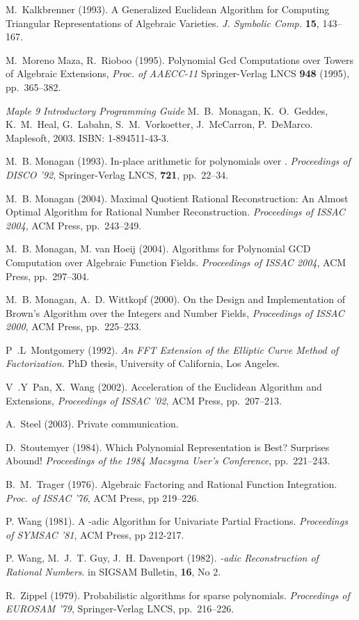 \documentclass[10pt]{article}
\begin{document}
\begin{thebibliography}{}
 M.~Kalkbrenner (1993).
A Generalized Euclidean Algorithm for Computing
Triangular Representations of Algebraic Varieties.
{\it J. Symbolic Comp.} {\bf 15}, 143--167.

 M.~Moreno Maza, R.~Rioboo (1995).
Polynomial Gcd Computations over Towers of Algebraic Extensions,
{\it Proc. of AAECC-11} Springer-Verlag LNCS {\bf 948} (1995), pp.~365--382.

{\it Maple 9 Introductory Programming Guide}
M.~B.~Monagan, K.~O.~Geddes, K.~M.~Heal, G.~Labahn,
S.~M.~Vorkoetter, J.~McCarron, P.~DeMarco.
Maplesoft, 2003.  ISBN: 1-894511-43-3.

 M.~B. Monagan (1993).
In-place arithmetic for polynomials over .
{\it Proceedings of DISCO '92}, Springer-Verlag LNCS, {\bf 721}, pp.~22--34.

 M.~B. Monagan (2004).
Maximal Quotient Rational Reconstruction: An Almost Optimal
Algorithm for Rational Number Reconstruction. 
{\it Proceedings of ISSAC 2004}, ACM Press, pp.~243--249.

 M.~B. Monagan, M. van Hoeij (2004).
Algorithms for Polynomial GCD Computation over Algebraic Function Fields.
{\it Proceedings of ISSAC 2004}, ACM Press, pp.~297--304.

M.~B. Monagan, A.~D. Wittkopf (2000).
On the Design and Implementation of Brown's
Algorithm over the Integers and Number Fields,
{\it Proceedings of ISSAC 2000}, ACM Press, pp.~225--233.

 P~.L~Montgomery (1992).
{\it An FFT Extension of the Elliptic Curve Method of Factorization.}
PhD thesis, University of California, Los Angeles.

 V~.Y~Pan, X.~Wang (2002).
Acceleration of the Euclidean Algorithm and Extensions,
{\it Proceedings of ISSAC '02}, ACM Press, pp.~207--213.

 A.~Steel (2003). Private communication.

 D.~Stoutemyer (1984).
Which Polynomial Representation is Best?  Surprises Abound!
{\it Proceedings of the 1984 Macsyma User's Conference},
pp.~221--243.

 B.~M.~Trager (1976).
Algebraic Factoring and Rational Function Integration.
{\it Proc. of ISSAC '76}, ACM Press, pp 219--226.

 P. Wang (1981).
A -adic Algorithm for Univariate Partial Fractions.
{\it Proceedings of SYMSAC '81}, ACM Press, pp 212-217.

 P. Wang, M.~J.~T. Guy, J.~H. Davenport (1982).
{\em -adic Reconstruction of Rational Numbers}.
in SIGSAM Bulletin, {\bf 16}, No 2.

 R.~Zippel (1979).
Probabilistic algorithms for sparse polynomials.
{\it Proceedings of EUROSAM '79}, Springer-Verlag LNCS, pp.~216--226.

\end{thebibliography}
\end{document}
